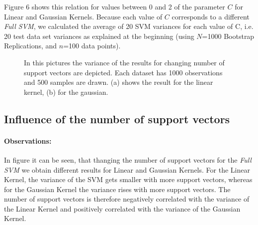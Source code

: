 \documentclass[a4paper]{article}
\begin{document}
Figure 6 shows this relation for values between 0 and 2 of the parameter $C$ 
for Linear and Gaussian Kernels. Because each value of $C$ corresponds to a different \textit{Full SVM}, we calculated the average of 20 SVM variances for each value of C, i.e. 20 test data set variances as explained at the beginning (using $N$=1000 Bootstrap Replications, and $n$=100 data points).
 
\begin{figure}[!htb]
\begin{center}

\caption{In this pictures the variance of the results for changing number of support vectors are depicted. Each dataset has 1000 observations and 500 samples are drawn. (a) shows the result for the linear kernel, (b) for the gaussian.}
\label{fig4}
\end{center}
\end{figure}


\subsection{Influence of the number of support vectors}
\paragraph{Observations:}
In figure \label{fig4} it can be seen, that thanging the number of support vectors for the \textit{Full SVM} we obtain different results for Linear and Gaussian Kernels. For the Linear Kernel, the variance of the SVM gets smaller with more support vectors, whereas for the Gaussian Kernel the variance rises with more support vectors. The number of support vectors is therefore negatively correlated with the variance of the Linear Kernel and positively correlated with the variance of the Gaussian Kernel.
\end{document}
